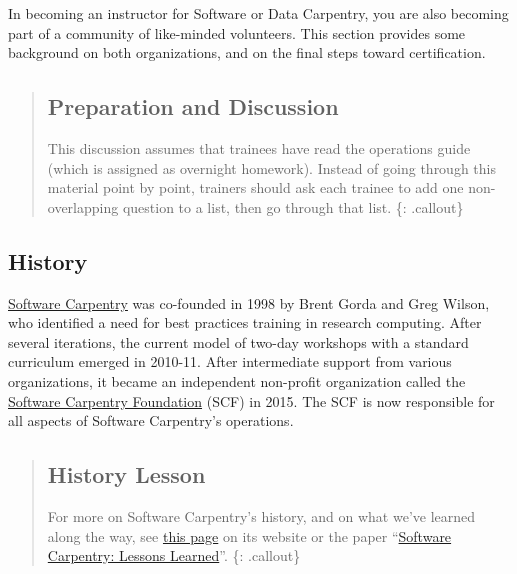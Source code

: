 
In becoming an instructor for Software or Data Carpentry, you are also
becoming part of a community of like-minded volunteers. This section
provides some background on both organizations, and on the final steps
toward certification.

\begin{quote}
\subsection{Preparation and Discussion}\label{preparation-and-discussion}

This discussion assumes that trainees have read the operations
guide (which is assigned as overnight homework). Instead of going through this material point by
point, trainers should ask each trainee to add one non-overlapping
question to a list, then go through that list. \{: .callout\}
\end{quote}

\subsection{History}\label{history}

\href{\{\{\%20site.swc\_site\%20\}\}}{Software Carpentry} was co-founded
in 1998 by Brent Gorda and Greg Wilson, who identified a need for best
practices training in research computing. After several iterations, the
current model of two-day workshops with a standard curriculum emerged in
2010-11. After intermediate support from various organizations, it
became an independent non-profit organization called the
\href{\{\{\%20site.swc\_site\%20\}\}/scf/}{Software Carpentry Foundation}
(SCF) in 2015. The SCF is now responsible for all aspects of Software
Carpentry's operations.

\begin{quote}
\subsection{History Lesson}\label{history-lesson}

For more on Software Carpentry's history, and on what we've learned
along the way, see
\href{\{\{\%20site.swc\_site\%20\}\}/scf/history/}{this page} on its
website or the paper
``\href{http://f1000research.com/articles/3-62/v2}{Software Carpentry:
Lessons Learned}''. \{: .callout\}
\end{quote}

